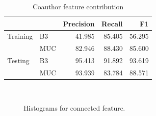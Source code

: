 \documentclass[twocolumn,letterpaper]{article}
\begin{document}
\begin{table}[ht]
\centering
\begin{tabular}{l || l | r r r}
 & & Precision & Recall & F1 \\ \hline
Training & B3 & 41.985 & 85.405 & 56.295 \\
 & MUC & 82.946 & 88.430 & 85.600\\ \hline
Testing & B3 & 95.413 & 91.892 & 93.619 \\
 & MUC & 93.939 & 83.784 & 88.571 \\
\end{tabular}
\caption{Coauthor feature contribution}
\label{tab:coauthor}
\end{table}


\begin{figure}[ht!]%
\centering 
{}\qquad 
{}\\ 
\caption{Histograms for connected feature.} 
\label{fig:3figs}
\end{figure}
\end{document}
